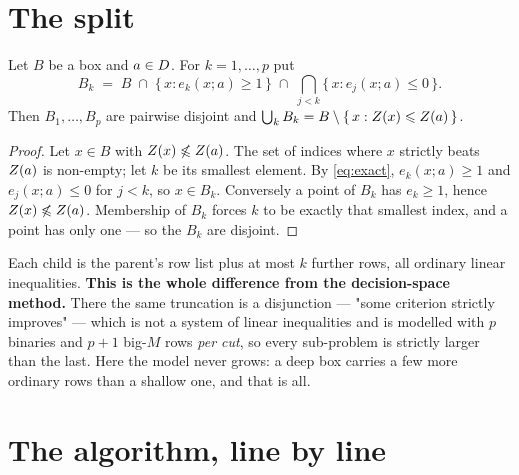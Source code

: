 \documentclass[11pt,a4paper]{article}
\begin{document}
\section{The split}

\begin{proposition}\label{prop:split}
Let $B$ be a box and $a \in D$.  For $k = 1,\dots,p$ put
\begin{equation}\label{eq:child}
  B_k \;=\; B \;\cap\; \{\, x : e_k(x;a) \geqslant 1 \,\}
            \;\cap\; \bigcap_{j<k} \{\, x : e_j(x;a) \leqslant 0 \,\} .
\end{equation}
Then $B_1,\dots,B_p$ are pairwise disjoint and
$\bigcup_k B_k = B \setminus \{\, x : Z(x) \leqslant Z(a) \,\}$.
\end{proposition}

\begin{proof}
Let $x \in B$ with $Z(x) \not\leqslant Z(a)$.  The set of indices where $x$
strictly beats $Z(a)$ is non-empty; let $k$ be its smallest element.  By
\eqref{eq:exact}, $e_k(x;a) \geqslant 1$ and $e_j(x;a) \leqslant 0$ for $j<k$,
so $x \in B_k$.  Conversely a point of $B_k$ has $e_k \geqslant 1$, hence
$Z(x) \not\leqslant Z(a)$.  Membership of $B_k$ forces $k$ to be exactly that
smallest index, and a point has only one --- so the $B_k$ are disjoint.
\end{proof}

\noindent
Each child is the parent's row list plus at most $k$ further rows, all ordinary
linear inequalities.  \textbf{This is the whole difference from the
decision-space method.}  There the same truncation is a disjunction --- "some
criterion strictly improves" --- which is not a system of linear inequalities
and is modelled with $p$ binaries and $p+1$ big-$M$ rows \emph{per cut}, so
every sub-problem is strictly larger than the last.  Here the model never
grows: a deep box carries a few more ordinary rows than a shallow one, and
that is all.

\section{The algorithm, line by line}
\end{document}
